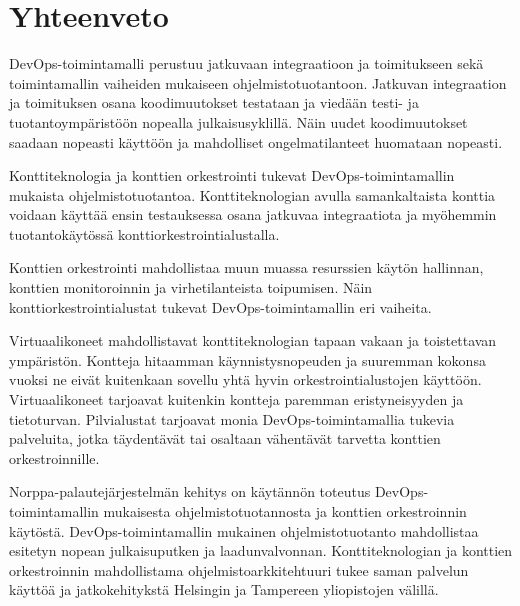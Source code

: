 \chapter{Yhteenveto\label{summary}}

DevOps-toimintamalli perustuu jatkuvaan integraatioon ja toimitukseen sekä toimintamallin vaiheiden mukaiseen ohjelmistotuotantoon.
Jatkuvan integraation ja toimituksen osana koodimuutokset testataan ja viedään testi- ja tuotantoympäristöön nopealla julkaisusyklillä.
Näin uudet koodimuutokset saadaan nopeasti käyttöön ja mahdolliset ongelmatilanteet huomataan nopeasti.

Konttiteknologia ja konttien orkestrointi tukevat DevOps-toimintamallin mukaista ohjelmistotuotantoa.
Konttiteknologian avulla samankaltaista konttia voidaan käyttää ensin testauksessa osana jatkuvaa integraatiota ja myöhemmin tuotantokäytössä konttiorkestrointialustalla.

Konttien orkestrointi mahdollistaa muun muassa resurssien käytön hallinnan, konttien monitoroinnin ja virhetilanteista toipumisen.
Näin konttiorkestrointialustat tukevat DevOps-toimintamallin eri vaiheita.

Virtuaalikoneet mahdollistavat konttiteknologian tapaan vakaan ja toistettavan ympäristön.
Kontteja hitaamman käynnistysnopeuden ja suuremman kokonsa vuoksi ne eivät kuitenkaan sovellu yhtä hyvin orkestrointialustojen käyttöön.
Virtuaalikoneet tarjoavat kuitenkin kontteja paremman eristyneisyyden ja tietoturvan.
Pilvialustat tarjoavat monia DevOps-toimintamallia tukevia palveluita, jotka täydentävät tai osaltaan vähentävät tarvetta konttien orkestroinnille.

Norppa-palautejärjestelmän kehitys on käytännön toteutus DevOps-toimintamallin mukaisesta ohjelmistotuotannosta ja konttien orkestroinnin käytöstä.
DevOps-toimintamallin mukainen ohjelmistotuotanto mahdollistaa esitetyn nopean julkaisuputken ja laadunvalvonnan.
Konttiteknologian ja konttien orkestroinnin mahdollistama ohjelmistoarkkitehtuuri tukee saman palvelun käyttöä ja jatkokehitykstä Helsingin ja Tampereen yliopistojen välillä.
